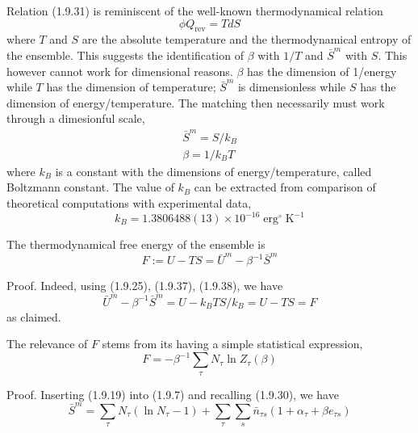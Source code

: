 \documentclass{article}
\begin{document}
Relation (1.9.31) is reminiscent of the well-known thermodynamical relation
$$
\begin{equation*}
\phi Q_{\mathrm{rev}}=T d S \tag{1.9.36}
\end{equation*}
$$
where $T$ and $S$ are the absolute temperature and the thermodynamical entropy of the ensemble. This suggests the identification of $\beta$ with $1 / T$ and $\bar{S}^{m}$ with $S$. This however cannot work for dimensional reasons. $\beta$ has the dimension of 1/energy while $T$ has the dimension of temperature; $\bar{S}^{m}$ is dimensionless while $S$ has the dimension of energy/temperature. The matching then necessarily must work through a dimesionful scale,
$$
\begin{gather*}
\bar{S}^{m}=S / k_{B}  \tag{1.9.37}\\
\beta=1 / k_{B} T \tag{1.9.38}
\end{gather*}
$$
where $k_{B}$ is a constant with the dimensions of energy/temperature, called Boltzmann constant. The value of $k_{B}$ can be extracted from comparison of theoretical computations with experimental data,
$$
\begin{equation*}
k_{B}=1.3806488(13) \times 10^{-16} \operatorname{erg}^{\circ} \mathrm{K}^{-1} \tag{1.9.39}
\end{equation*}
$$

The thermodynamical free energy of the ensemble is
$$
\begin{equation*}
F:=U-T S=\bar{U}^{m}-\beta^{-1} \bar{S}^{m} \tag{1.9.40}
\end{equation*}
$$

Proof. Indeed, using (1.9.25), (1.9.37), (1.9.38), we have
$$
\begin{equation*}
\bar{U}^{m}-\beta^{-1} \bar{S}^{m}=U-k_{B} T S / k_{B}=U-T S=F \tag{1.9.41}
\end{equation*}
$$
as claimed.

The relevance of $F$ stems from its having a simple statistical expression,
$$
\begin{equation*}
F=-\beta^{-1} \sum_{\tau} N_{\tau} \ln Z_{\tau}(\beta) \tag{1.9.42}
\end{equation*}
$$

Proof. Inserting (1.9.19) into (1.9.7) and recalling (1.9.30), we have
$$
\begin{equation*}
\bar{S}^{m}=\sum_{\tau} N_{\tau}\left(\ln N_{\tau}-1\right)+\sum_{\tau} \sum_{s} \bar{n}_{\tau s}\left(1+\alpha_{\tau}+\beta e_{\tau s}\right) \tag{1.9.43}
\end{equation*}
$$
\end{document}
